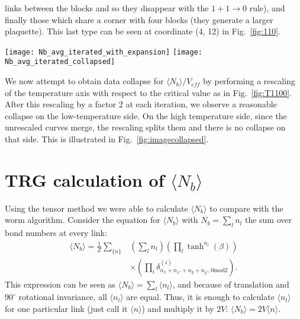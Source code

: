 \documentclass[../main.tex]{subfiles}
\begin{document}
links between the blocks and so they disappear with the $1+1\rightarrow0$
rule), and finally those which share a corner with four blocks (they generate a
larger plaquette).  This last type can be seen at coordinate (4, 12) in
Fig.~\ref{fig:110}.
%
\begin{figure*}[htpb]
    \centering 
    \texttt{[image: Nb\_avg\_iterated\_with\_expansion]}\hfill%
    \texttt{[image: Nb\_avg\_iterated\_collapsed]}
    \caption{(a) Average number of bonds $\langle N_b\rangle$ vs.\ temperature
        $T$ under iterated blocking steps beginning with an initial lattice
        size of $L = 64$. The dashed black line illustrates the high
        temperature expansion, showing that the dominant configurations are
        those consisting of small, isolated plaquettes. (b) Average number of
    bonds $\langle N_b\rangle$ vs.\ the rescaled temperature $(T - 2.269) /
    L_{eff}$ under successive blocking steps. Iteration 0 represents the
    original lattice before blocking, with $L_{eff} = 64$. }%
\label{fig:imagecollapsed}
\end{figure*}
%
We now attempt to obtain data collapse for $\langle N_b \rangle/V_{eff}$ by
performing a rescaling of the temperature axis with respect to the critical
value as in Fig.~\ref{fig:T1100}. After this rescaling by a factor 2 at each
iteration, we observe a reasonable collapse on the low-temperature side.  On
the high temperature side, since the unrescaled curves merge, the rescaling
splits them and there is no collapse on that side. This is illustrated in
Fig.~\ref{fig:imagecollapsed}.  

\section{TRG calculation of \texorpdfstring{$\langle N_b \rangle$}{<Nb>}}%
\label{sec:nbtrg}
Using the tensor method we were able to calculate $\langle N_{b} \rangle$ to
compare with the worm algorithm.  Consider the equation for $\langle N_{b}
\rangle$ with $N_{b} = \sum_{l} n_{l}$ the sum over bond numbers at every link:
%
\begin{align}
    \langle N_{b} \rangle = \frac{1}{Z} \sum_{\{n\}} &\left( \sum_{l} n_{l}
    \right) \left( \prod_{l} \tanh^{n_{l}}(\beta) \right) \\ 
      \nonumber &\times {\left( \prod_{i} \delta^{(i)}_{n_{x}+n_{x'}+n_{y}+n_{y'},
      0\text{mod}2}\right)}.
\end{align}
%
This expression can be seen as $\langle N_{b} \rangle = \sum_{l} \langle n_{l}
\rangle$, and because of translation and $90^{\circ}$ rotational invariance,
all $\langle n_{l} \rangle$ are equal.  Thus, it is enough to calculate
$\langle n_{l} \rangle$ for one particular link (just call it $\langle
n\rangle$) and multiply it by $2V$: $\langle N_{b} \rangle = 2V \langle n
\rangle$.
\end{document}
